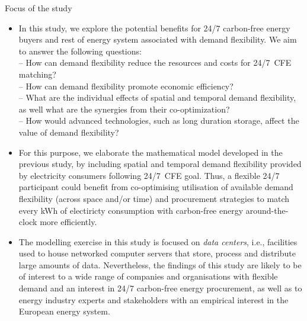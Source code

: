 \begin{frame}{Focus of the study}

  {\footnotesize
  \begin{itemize}
    \item In this study, we explore the potential benefits for 24/7 carbon-free energy buyers and rest of energy system associated with demand flexibility. We aim to answer the following questions: \\

    \vspace{0.1cm}
    -- How can demand flexibility reduce the \alert{resources} and \alert{costs} for 24/7~CFE matching?\\ 
    -- How can demand flexibility promote \alert{economic efficiency}?\\
    -- What are the \alert{individual effects} of spatial and temporal demand flexibility, as well what are the synergies from their co-optimization? \\
    -- How would advanced technologies, such as long duration storage, affect \alert{the value of demand flexibility}?

    \item For this purpose, we elaborate the mathematical model developed in the previous study, by including spatial and temporal demand flexibility provided by electricity consumers following 24/7~CFE goal. Thus, a flexible 24/7 participant could benefit from \alert{co-optimising} utilisation of available demand flexibility (across space and/or time) and procurement strategies to match every kWh of electiricty consumption with carbon-free energy around-the-clock \alert{more efficiently}.
    
    \item The modelling exercise in this study is focused on \textit{data centers}, i.e., facilities used to house networked computer servers that store, process and distribute large amounts of data. Nevertheless, the findings of this study are likely to be of interest to a wide range of companies and organisations with flexible demand and an interest in 24/7 carbon-free energy procurement, as well as to energy industry experts and stakeholders with an empirical interest in the European energy system.

  \end{itemize}

  }
\end{frame}



